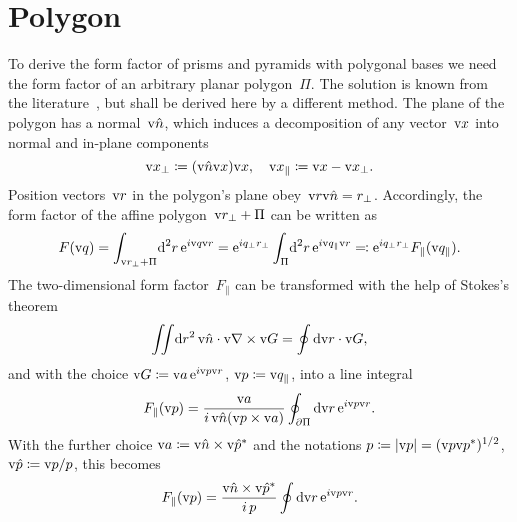 
\section{Polygon}\label{SFFPolygon}

%
\def\R{\v{R}}
\def\E{\v{E}}
\def\x{\v{x}}
\def\V{\v{V}}
\def\qp{\v{p}}
\def\n{\v{\hat n}}
\def\uqp{\v{\hat p}}

To derive the form factor of prisms and pyramids with polygonal bases
we need the form factor of an arbitrary planar polygon~$\Pi$.
The solution is known from the literature~\cite{LeMi83},
but shall be derived here by a different method.
The plane of the polygon has a normal~$\n$,
which induces a decomposition of any vector~$\x$ into normal
and in-plane components
\begin{equation}
  \x_\perp\coloneqq (\n\x)\x,\quad
  \x_\parallel\coloneqq\x-\x_\perp.
\end{equation}
Position vectors~$\text{v}{r}$ in the polygon's plane obey~$\r\n=r_\perp$.
Accordingly, the form factor of the affine polygon~$\text{v}{r}_\perp+\Pi$
can be written as
%
\begin{equation}\label{Eff2d}
  F(\text{v}{q})
  = \int_{\text{v}{r}_\perp+\Pi}\!\text{d}^2r\, \text{e}^{i\text{v}{q}\text{v}{r}}
  =\text{e}^{iq_\perp r_\perp} \int_{\Pi}\!\text{d}^2r\, \text{e}^{i\text{v}{q}_\parallel\text{v}{r}}
  \eqqcolon \text{e}^{iq_\perp r_\perp} F_\parallel(\text{v}{q}_\parallel).
\end{equation}
The two-dimensional form factor~$F_\parallel$
can be transformed with the help of Stokes's theorem
\begin{equation}
  \iint\!\d r^2\,\n\cdot\Nabla\times\v{G} = \oint \d\v{r}\cdot\v{G},
\end{equation}
and with the choice $\v{G}\coloneqq\v{a}\, \e^{i\qp\r}$, $\qp\coloneqq\q_\parallel$,
into a line integral
\begin{equation}
  F_\parallel(\qp)=\frac{\v{a}}{i\, \n(\qp\times\v{a})} \oint_{\partial\Pi} \d\v{r}\,\e^{i\qp\r}.
\end{equation}
With the further choice $\v{a}\coloneqq\n\times\uqp^*$
and the notations $p\coloneqq|\qp|=(\qp\qp^*)^{1/2}$, $\uqp\coloneqq\qp/p$,
this becomes
\begin{equation}\label{Elastoint}
  F_\parallel(\qp)=\frac{\n\times\uqp^*}{i\,p} \oint \d\v{r}\,\e^{i\qp\r}.
\end{equation}
